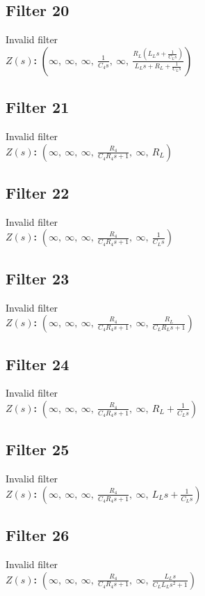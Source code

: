 \documentclass{article}
\begin{document}
\subsection*{Filter 20}
Invalid filter \\ 
\textbf{$Z(s)$:} $\left( \infty, \  \infty, \  \infty, \  \frac{1}{C_{4} s}, \  \infty, \  \frac{R_{L} \left(L_{L} s + \frac{1}{C_{L} s}\right)}{L_{L} s + R_{L} + \frac{1}{C_{L} s}}\right)$ \\ 
\subsection*{Filter 21}
Invalid filter \\ 
\textbf{$Z(s)$:} $\left( \infty, \  \infty, \  \infty, \  \frac{R_{4}}{C_{4} R_{4} s + 1}, \  \infty, \  R_{L}\right)$ \\ 
\subsection*{Filter 22}
Invalid filter \\ 
\textbf{$Z(s)$:} $\left( \infty, \  \infty, \  \infty, \  \frac{R_{4}}{C_{4} R_{4} s + 1}, \  \infty, \  \frac{1}{C_{L} s}\right)$ \\ 
\subsection*{Filter 23}
Invalid filter \\ 
\textbf{$Z(s)$:} $\left( \infty, \  \infty, \  \infty, \  \frac{R_{4}}{C_{4} R_{4} s + 1}, \  \infty, \  \frac{R_{L}}{C_{L} R_{L} s + 1}\right)$ \\ 
\subsection*{Filter 24}
Invalid filter \\ 
\textbf{$Z(s)$:} $\left( \infty, \  \infty, \  \infty, \  \frac{R_{4}}{C_{4} R_{4} s + 1}, \  \infty, \  R_{L} + \frac{1}{C_{L} s}\right)$ \\ 
\subsection*{Filter 25}
Invalid filter \\ 
\textbf{$Z(s)$:} $\left( \infty, \  \infty, \  \infty, \  \frac{R_{4}}{C_{4} R_{4} s + 1}, \  \infty, \  L_{L} s + \frac{1}{C_{L} s}\right)$ \\ 
\subsection*{Filter 26}
Invalid filter \\ 
\textbf{$Z(s)$:} $\left( \infty, \  \infty, \  \infty, \  \frac{R_{4}}{C_{4} R_{4} s + 1}, \  \infty, \  \frac{L_{L} s}{C_{L} L_{L} s^{2} + 1}\right)$ \\ 
\end{document}
